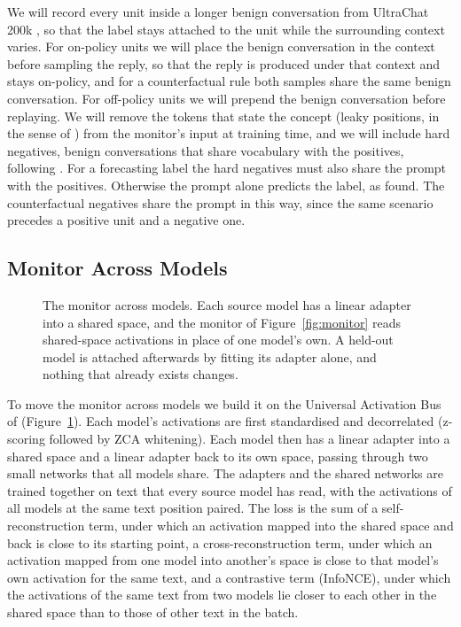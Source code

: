 \documentclass{article}
\begin{document}
We will record every unit inside a longer benign conversation from UltraChat 200k \citep{ding2023ultrachat}, so that the label stays attached to the unit while the surrounding context varies. For on-policy units we will place the benign conversation in the context before sampling the reply, so that the reply is produced under that context and stays on-policy, and for a counterfactual rule both samples share the same benign conversation. For off-policy units we will prepend the benign conversation before replaying. We will remove the tokens that state the concept (leaky positions, in the sense of \cite{boxo2025}) from the monitor's input at training time, and we will include hard negatives, benign conversations that share vocabulary with the positives, following \cite{zhou2026}. For a forecasting label the hard negatives must also share the prompt with the positives. Otherwise the prompt alone predicts the label, as \cite{fomin2026} found. The counterfactual negatives share the prompt in this way, since the same scenario precedes a positive unit and a negative one.

\subsection{Monitor Across Models}
\label{sec:bus}

\begin{figure}[t]
\centering
\resizebox{0.74\textwidth}{!}{}
\caption{The monitor across models. Each source model has a linear adapter into a shared space, and the monitor of Figure~\ref{fig:monitor} reads shared-space activations in place of one model's own. A held-out model is attached afterwards by fitting its adapter alone, and nothing that already exists changes.}
\label{fig:bus}
\end{figure}

To move the monitor across models we build it on the Universal Activation Bus of \cite{kim2026bus} (Figure~\ref{fig:bus}). Each model's activations are first standardised and decorrelated (z-scoring followed by ZCA whitening). Each model then has a linear adapter into a shared space and a linear adapter back to its own space, passing through two small networks that all models share. The adapters and the shared networks are trained together on text that every source model has read, with the activations of all models at the same text position paired. The loss is the sum of a self-reconstruction term, under which an activation mapped into the shared space and back is close to its starting point, a cross-reconstruction term, under which an activation mapped from one model into another's space is close to that model's own activation for the same text, and a contrastive term (InfoNCE), under which the activations of the same text from two models lie closer to each other in the shared space than to those of other text in the batch.
\end{document}
